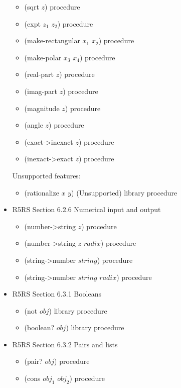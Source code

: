 \documentclass{article}
\begin{document}
\begin{itemize}
\begin{itemize}
		\item (sqrt $z$)	\hfill	procedure
		\item (expt $z_1$ $z_2$)	\hfill	procedure
		
		\item (make-rectangular $x_1$ $x_2$)	\hfill	procedure
		\item (make-polar $x_3$ $x_4$)	\hfill	procedure
		\item (real-part $z$)	\hfill	procedure
		\item (imag-part $z$)	\hfill	procedure
		\item (magnitude $z$)	\hfill	procedure
		\item (angle $z$)	\hfill	procedure		
		
		\item (exact->inexact $z$)	\hfill	procedure
		\item (inexact->exact $z$)	\hfill	procedure
	\end{itemize}
	
	Unsupported features:
		\begin{itemize}
			\item (rationalize $x$ $y$)	(Unsupported) \hfill	library procedure
		\end{itemize}
			
	
\item R5RS Section 6.2.6 Numerical input and output
	\begin{itemize}
		\item (number->string $z$)	\hfill	procedure
		\item (number->string $z$ $radix$)	\hfill	procedure
		
		\item (string->number $string$)	\hfill	procedure
		\item (string->number $string$ $radix$)	\hfill	procedure
	\end{itemize}
	
\item R5RS Section 6.3.1 Booleans
	\begin{itemize}
		\item (not $obj$)	\hfill	library procedure
		
		\item (boolean? $obj$)	\hfill	library procedure
	\end{itemize}

\item R5RS Section 6.3.2 Pairs and lists
	\begin{itemize}
		\item (pair? $obj$)	\hfill	procedure
		\item (cons $obj_1$ $obj_2$)	\hfill	procedure


\end{itemize}
\end{itemize}
\end{document}
